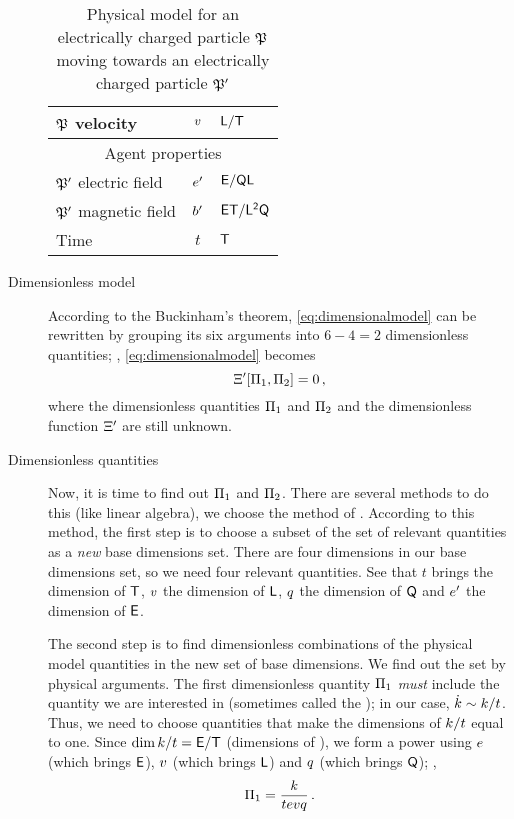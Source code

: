 \begin{description}
\begin{table}
\begin{center}
\begin{tabularx}{0.60\textwidth}{lcX}
$\mathfrak{P}$ velocity         & $v$     & $\mathsf{L/T}$ \\
%
\midrule
\multicolumn{3}{c}{Agent properties} \\
\midrule
%
$\mathfrak{P}'$ electric field  & $e'$ & $\mathsf{E/QL}$ \\
$\mathfrak{P}'$ magnetic field  & $b'$ & $\mathsf{ET/L^2Q}$ \\
%
\midrule
%
Time & $t$ & $\mathsf{T}$ \\
%
\bottomrule
%
  \end{tabularx}\end{center}\endgroup\normalsize
  \caption[Physical model: electric phenomenon]
  {Physical model for an electrically charged particle $\mathfrak{P}$ moving towards an electrically charged particle $\mathfrak{P}'$}
  \label{tab:physicalmodelelectricparticle}
\end{table}
%
%
%
\item[Dimensionless model] According to the Buckinham's theorem, \cref{eq:dimensionalmodel} can be rewritten by grouping its six arguments into $6 - 4 = 2$ dimensionless quantities; \ie, \cref{eq:dimensionalmodel} becomes
%
\begin{equation}
  \Xi'\!\left[{\Pi_1, \Pi_2}\right] = 0 \,,
\end{equation}
%
where the dimensionless quantities $\Pi_1$ and $\Pi_2$ and the dimensionless function $\Xi'$ are still unknown.
%
\item[Dimensionless quantities] Now, it is time to find out $\Pi_1$ and $\Pi_2$. There are several methods to do this (like linear algebra), we choose the method of . According to this method, the first step is to choose a subset of the set of relevant quantities as a \emph{new} base dimensions set. There are four dimensions in our base dimensions set, so we need four relevant quantities. See that $t$ brings the dimension of $\mathsf{T}$, $v$ the dimension of $\mathsf{L}$, $q$ the dimension of $\mathsf{Q}$ and $e'$ the dimension of $\mathsf{E}$. 

The second step is to find dimensionless combinations of the physical model quantities in the new set of base dimensions. We find out the set by physical arguments. The first dimensionless quantity $\Pi_1$ \emph{must} include the quantity we are interested in (sometimes called the ); in our case, $\dot{k}\sim k/t$. Thus, we need to choose quantities that make the dimensions of $k/t$ equal to one. Since $\dim k/t = \mathsf{E}/\mathsf{T}$ (dimensions of ), we form a power using $e$ (which brings $\mathsf{E}$), $v$ (which brings $\mathsf{L}$) and $q$ (which brings $\mathsf{Q}$); \ie,
%
\begin{equation}
  \Pi_1 = \dfrac{k}{tevq}\,.
\end{equation}


\end{description}
